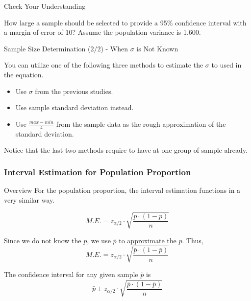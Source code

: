 \documentclass{beamer}
\begin{document}
\begin{frame}{Check Your Understanding}

How large a sample should be selected to provide a 95\% confidence interval with a margin of error of 10? Assume the population variance is 1,600. 


\end{frame}



\begin{frame}{Sample Size Determination (2/2) - When $\sigma$ is Not Known} 

You can utilize one of the following three methods to estimate the $\sigma$ to used in the equation. 

\begin{itemize}
\item Use $\sigma$ from the previous studies.
\item Use sample standard deviation instead.
\item Use $\frac{max-min}{4}$ from the sample data as the rough approximation of the standard deviation.
\end{itemize}

Notice that the last two methods require to have at one group of sample already. 


\end{frame}


\subsubsection{Interval Estimation for Population Proportion}

\begin{frame}{Overview}
For the population proportion, the interval estimation functions in a very similar way. 

$$M.E. = z_{\alpha/2} \cdot \sqrt{\frac{p\cdot(1-p)}{n}}$$ 

Since we do not know the $p$, we use $\bar{p}$ to approximate the $p$. Thus, 
$$M.E. = z_{\alpha/2} \cdot \sqrt{\frac{\bar{p}\cdot(1-\bar{p})}{n}}$$ 

The confidence interval for any given sample $\bar{p}$ is
$$\bar{p} \pm z_{\alpha/2} \cdot \sqrt{\frac{\bar{p}\cdot(1-\bar{p})}{n}} $$

\end{frame}
\end{document}

